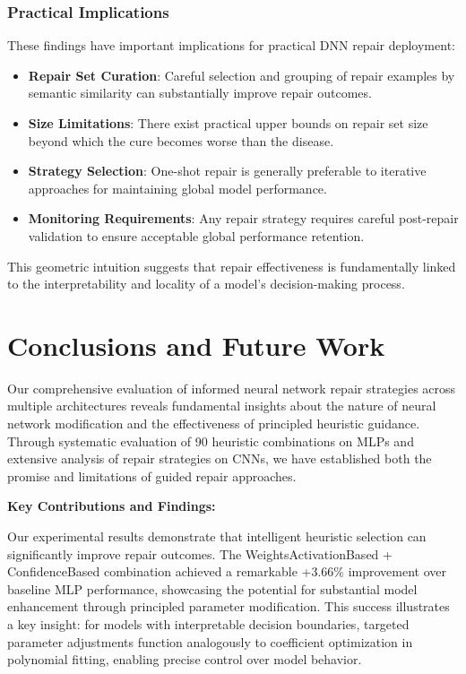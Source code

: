 \documentclass{article}
\begin{document}
\subsubsection{Practical Implications}

These findings have important implications for practical DNN repair deployment:

\begin{itemize}
	\item \textbf{Repair Set Curation}: Careful selection and grouping of repair examples by semantic similarity can substantially improve repair outcomes.
	\item \textbf{Size Limitations}: There exist practical upper bounds on repair set size beyond which the cure becomes worse than the disease.
	\item \textbf{Strategy Selection}: One-shot repair is generally preferable to iterative approaches for maintaining global model performance.
	\item \textbf{Monitoring Requirements}: Any repair strategy requires careful post-repair validation to ensure acceptable global performance retention.
\end{itemize}

This geometric intuition suggests that repair effectiveness is fundamentally linked to the interpretability and locality of a model's decision-making process.

\section{Conclusions and Future Work}

Our comprehensive evaluation of informed neural network repair strategies across multiple architectures reveals fundamental insights about the nature of neural network modification and the effectiveness of principled heuristic guidance. Through systematic evaluation of 90 heuristic combinations on MLPs and extensive analysis of repair strategies on CNNs, we have established both the promise and limitations of guided repair approaches.

\textbf{Key Contributions and Findings:}

Our experimental results demonstrate that intelligent heuristic selection can significantly improve repair outcomes. The WeightsActivationBased + ConfidenceBased combination achieved a remarkable +3.66\% improvement over baseline MLP performance, showcasing the potential for substantial model enhancement through principled parameter modification. This success illustrates a key insight: for models with interpretable decision boundaries, targeted parameter adjustments function analogously to coefficient optimization in polynomial fitting, enabling precise control over model behavior.
\end{document}
